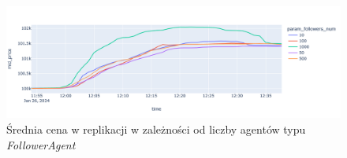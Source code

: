 \begin{center}
\begin{figure}
\begin{center}
\includegraphics[scale=0.4]{ball.png}
\end{center}
\caption{Średnia cena w replikacji w zależności od liczby agentów typu \textit{FollowerAgent}}\label{fig:ball}
\end{figure}
\end{center}






% 
